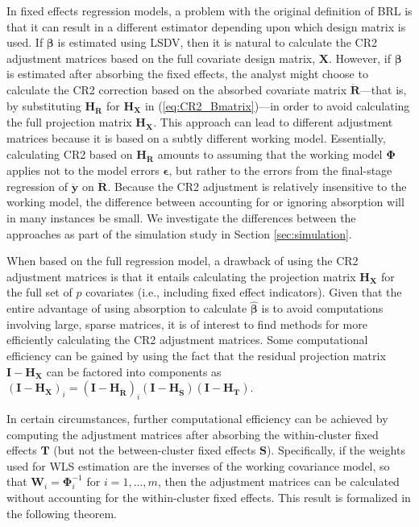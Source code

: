 \documentclass[12pt]{article}
\begin{document}
In fixed effects regression models, a problem with the original
definition of BRL is that it can result in a different estimator
depending upon which design matrix is used. If \(\boldsymbol\beta\) is
estimated using LSDV, then it is natural to calculate the CR2 adjustment
matrices based on the full covariate design matrix, \(\mathbf{X}\).
However, if \(\boldsymbol\beta\) is estimated after absorbing the fixed
effects, the analyst might choose to calculate the CR2 correction based
on the absorbed covariate matrix \(\mathbf{\ddot{R}}\)---that is, by
substituting \(\mathbf{H_{\ddot{R}}}\) for \(\mathbf{H_X}\) in
(\ref{eq:CR2_Bmatrix})---in order to avoid calculating the full
projection matrix \(\mathbf{H_X}\). This approach can lead to different
adjustment matrices because it is based on a subtly different working
model. Essentially, calculating CR2 based on \(\mathbf{H_{\ddot{R}}}\)
amounts to assuming that the working model \(\boldsymbol\Phi\) applies
not to the model errors \(\boldsymbol\epsilon\), but rather to the
errors from the final-stage regression of \(\mathbf{\ddot{y}}\) on
\(\mathbf{\ddot{R}}\). Because the CR2 adjustment is relatively
insensitive to the working model, the difference between accounting for
or ignoring absorption will in many instances be small. We investigate
the differences between the approaches as part of the simulation study
in Section \ref{sec:simulation}.

When based on the full regression model, a drawback of using the CR2
adjustment matrices is that it entails calculating the projection matrix
\(\mathbf{H_X}\) for the full set of \(p\) covariates (i.e., including
fixed effect indicators). Given that the entire advantage of using
absorption to calculate \(\hat{\boldsymbol\beta}\) is to avoid
computations involving large, sparse matrices, it is of interest to find
methods for more efficiently calculating the CR2 adjustment matrices.
Some computational efficiency can be gained by using the fact that the
residual projection matrix \(\mathbf{I} - \mathbf{H_X}\) can be factored
into components as
\(\left(\mathbf{I} - \mathbf{H_X}\right)_i = \left(\mathbf{I} - \mathbf{H_{\ddot{R}}}\right)_i \left(\mathbf{I} - \mathbf{H_{\ddot{S}}}\right) \left(\mathbf{I} - \mathbf{H_T}\right)\).

In certain circumstances, further computational efficiency can be
achieved by computing the adjustment matrices after absorbing the
within-cluster fixed effects \(\mathbf{T}\) (but not the between-cluster
fixed effects \(\mathbf{S}\)). Specifically, if the weights used for WLS
estimation are the inverses of the working covariance model, so that
\(\mathbf{W}_i = \boldsymbol\Phi_i^{-1}\) for \(i = 1,...,m\), then the
adjustment matrices can be calculated without accounting for the
within-cluster fixed effects. This result is formalized in the following
theorem.
\end{document}

